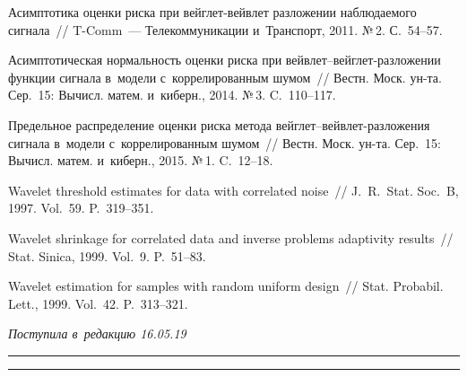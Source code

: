 \begin{multicols}{2}
{{\begin{thebibliography}{99}
Асимптотика оценки риска при вейг\-лет-вейв\-лет разложении наблюдаемого сигнала~// 
T-Comm~--- Телекоммуникации и~Транспорт, 2011. №\,2. С.~54--57.

Асимптотическая нормальность оценки риска при вейв\-лет--вейг\-лет-раз\-ло\-же\-нии 
функции сигнала в~модели с~коррелированным шумом~// 
Вестн. Моск. ун-та. Сер.~15: Вычисл. матем. и~киберн., 2014. №\,3. C.~110--117.

Предельное распределение оценки риска метода вейг\-лет--вейв\-лет-раз\-ло\-же\-ния 
сигнала в~модели с~коррелированным шумом~// Вестн. Моск. ун-та. Сер.~15: 
Вычисл. матем. и~киберн., 2015. №\,1. C.~12--18.

Wavelet threshold estimates for data with correlated noise~// J.~R.~Stat.
Soc.~B, 1997. Vol.~59. P.~319--351.

Wavelet shrinkage for correlated data and inverse problems adaptivity results~// 
Stat. Sinica, 1999. Vol.~9. P.~51--83.

 Wavelet estimation for samples with random uniform design~// 
Stat. Probabil. Lett., 1999. Vol.~42. P.~313--321.
 \end{thebibliography}

 }
 }

\end{multicols}

\vspace*{-6pt}

\hfill{\small\textit{Поступила в~редакцию 16.05.19}}

\vspace*{8pt}




\hrule

\vspace*{2pt}

\hrule


\def\tit{THE MEAN SQUARE RISK OF~NONLINEAR REGULARIZATION IN~THE~PROBLEM OF~INVERSION 
OF~LINEAR HOMOGENEOUS OPERATORS WITH~A~RANDOM SAMPLE SIZE}


